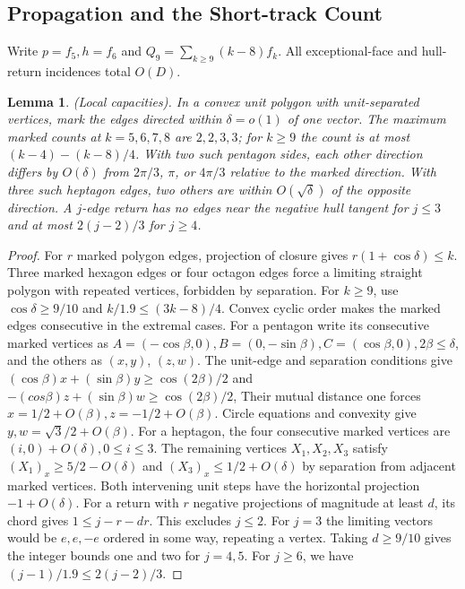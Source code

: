 \documentclass[10pt,reqno]{amsart}
\newtheorem{lemma}{Lemma}[section]
\begin{document}
\subsection{Propagation and the Short-track Count}


Write $p = f_5, h = f_6$ and $Q_9 = \sum_{k \ge 9}(k - 8) f_k$. All exceptional-face and hull-return incidences total $O(D)$.

\begin{lemma}
    (Local capacities). In a convex unit polygon with unit-separated vertices, mark the edges directed within $\delta = o(1)$ of one vector. The maximum marked counts at $k = 5, 6, 7, 8$ are $2, 2, 3, 3$; for $k \ge 9$ the count is at most $(k - 4) - (k - 8)/4$. With two such pentagon sides, each other direction differs by $O(\delta)$ from $2 \pi / 3$, $\pi$, or $4 \pi / 3$ relative to the marked direction. With three such heptagon edges, two others are within $O(\sqrt{\delta})$ of the opposite direction. A $j$-edge return has no edges near the negative hull tangent for $j \le 3$ and at most $2(j - 2) / 3$ for $j \ge 4$.
\end{lemma}

\begin{proof}
    For $r$ marked polygon edges, projection of closure gives $r(1 + \cos \delta) \le k$. Three marked hexagon edges or four octagon edges force a limiting straight polygon with repeated vertices, forbidden by separation. For $k \ge 9$, use $\cos \delta \ge 9 / 10$ and $k / 1.9 \le (3k - 8) / 4$. Convex cyclic order makes the marked edges consecutive in the extremal cases. For a pentagon write its consecutive marked vertices as $A = ( - \cos \beta, 0), B = (0, - \sin \beta), C = (\cos \beta, 0), 2 \beta \le \delta$, and the others as $(x, y)$, $(z, w)$. The unit-edge and separation conditions give $(\cos \beta) x + (\sin \beta) y \ge \cos (2\beta)/ 2 $ and $-(cos \beta) z + (\sin \beta) w \ge \cos (2 \beta) / 2$, Their mutual distance one forces $x = 1/2 + O (\beta), z = -1/2 + O(\beta)$. Circle equations and convexity give $y, w = \sqrt3 / 2 + O(\beta)$. For a heptagon, the four consecutive marked vertices are $(i, 0) + O(\delta), 0 \le i \le 3$. The remaining vertices $X_1, X_2, X_3$ satisfy $(X_1)_x \ge 5 / 2 - O(\delta)$ and $(X_3)_x \le 1/2 + O(\delta)$ by separation from adjacent marked vertices. Both intervening unit steps have the horizontal projection $-1 + O(\delta)$. For a return with $r$ negative projections of magnitude at least $d$, its chord gives $1 \le j - r - dr$. This excludes $j \le 2$. For $j = 3$ the limiting vectors would be $e, e, -e$ ordered in some way, repeating a vertex. Taking $d \ge 9 / 10$ gives the integer bounds one and two for $j = 4, 5$. For $j \ge 6$, we have $(j - 1) / 1.9 \le 2(j-2) / 3$.
\end{proof}
\end{document}

